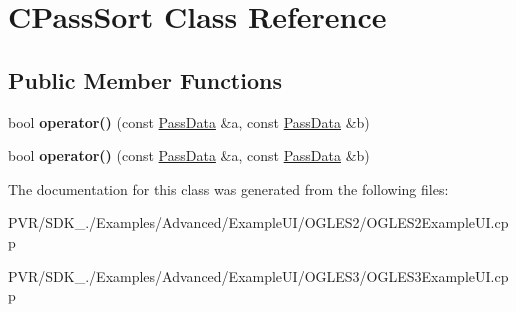 \hypertarget{class_c_pass_sort}{\section{C\+Pass\+Sort Class Reference}
\label{class_c_pass_sort}
}
\subsection*{Public Member Functions}
\begin{DoxyCompactItemize}
\item 
\hypertarget{class_c_pass_sort_ac6c527bd182cc3c852dd2ea3a9f5971f}{bool {\bfseries operator()} (const \hyperlink{struct_pass_data}{Pass\+Data} \&a, const \hyperlink{struct_pass_data}{Pass\+Data} \&b)}\label{class_c_pass_sort_ac6c527bd182cc3c852dd2ea3a9f5971f}

\item 
\hypertarget{class_c_pass_sort_ac6c527bd182cc3c852dd2ea3a9f5971f}{bool {\bfseries operator()} (const \hyperlink{struct_pass_data}{Pass\+Data} \&a, const \hyperlink{struct_pass_data}{Pass\+Data} \&b)}\label{class_c_pass_sort_ac6c527bd182cc3c852dd2ea3a9f5971f}

\end{DoxyCompactItemize}


The documentation for this class was generated from the following files\+:\begin{DoxyCompactItemize}
\item 
P\+V\+R/\+S\+D\+K\+\_./\+Examples/\+Advanced/\+Example\+U\+I/\+O\+G\+L\+E\+S2/O\+G\+L\+E\+S2\+Example\+U\+I.\+cpp\item 
P\+V\+R/\+S\+D\+K\+\_./\+Examples/\+Advanced/\+Example\+U\+I/\+O\+G\+L\+E\+S3/O\+G\+L\+E\+S3\+Example\+U\+I.\+cpp\end{DoxyCompactItemize}
